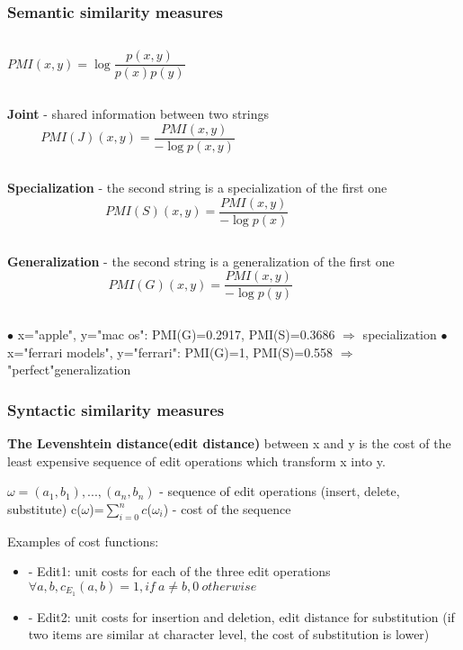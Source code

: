 \begin{frame}
	\frametitle{Semantic similarity measures}
	\begin{columns}
	  \begin{equation}
PMI(x,y)=\log{\frac{p(x,y)}{p(x)p(y)}}
	  \nonumber
	  \end{equation}
	\end{columns}
	\begin{columns}
	 \column{.6\textwidth}
\textbf{Joint} - shared information between two strings
	 \column{.4\textwidth}
	  \begin{equation}
PMI(J)(x,y)=\frac{PMI(x,y)}{-\log{p(x,y)}}
	  \nonumber
	  \end{equation}
	\end{columns}
	\begin{columns}
\textbf{Specialization} - the second string is a specialization of the first one
	  \begin{equation}
PMI(S)(x,y)=\frac{PMI(x,y)}{-\log{p(x)}}
	  \nonumber
	  \end{equation}
	\end{columns}
	\begin{columns}
	 \column{.6\textwidth}
\textbf{Generalization} - the second string is a generalization of the first one
	 \column{.4\textwidth}
	  \begin{equation}
PMI(G)(x,y)=\frac{PMI(x,y)}{-\log{p(y)}}
	  \nonumber
	  \end{equation}
	\end{columns}
	\vskip7pt
	$\bullet$ x="apple", y="mac os": PMI(G)=0.2917, PMI(S)=0.3686 $\Rightarrow$ specialization \newline
	$\bullet$ x="ferrari models", y="ferrari": PMI(G)=1, PMI(S)=0.558 $\Rightarrow$ "perfect"generalization
\end{frame}

\begin{frame}
	\frametitle{Syntactic similarity measures}
	\textbf{The Levenshtein distance(edit distance)} between x and y is the cost of the least expensive sequence of edit operations which transform x into y.
	\vskip7pt

	$\omega=(a_{1},b_{1}),...,(a_{n},b_{n})$ - sequence of edit operations (insert, delete, substitute) \newline
	c($\omega$)=$\sum_{i=0}^n c$($\omega_{i}$) - cost of the sequence

	\vskip7pt
	Examples of cost functions:
	\begin{itemize}
	 \item
          - Edit1: unit costs for each of the three edit operations
	  $\forall a,b, c_{E_{1}}(a,b)=1, if\ {a}\neq{b}, 0\ otherwise$
	 \item
	 - Edit2: unit costs for insertion and deletion, edit distance for substitution (if two items are similar at character level, the cost of substitution is lower) 
	\end{itemize}
\end{frame}

